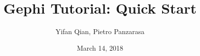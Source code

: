 \documentclass[10pt]{beamer}
\title[Gephi Tutorial: Quick Start]{Gephi Tutorial: Quick Start} %
\author{Yifan Qian, Pietro Panzarasa} %
\institute[QMUL] %
{
BUSM132 Complex Networks and Innovation \\
Queen Mary University of London \\ %
}
\date{March 14, 2018}
\begin{document}
\begin{frame}
\titlepage %
\end{frame}





\end{document}
